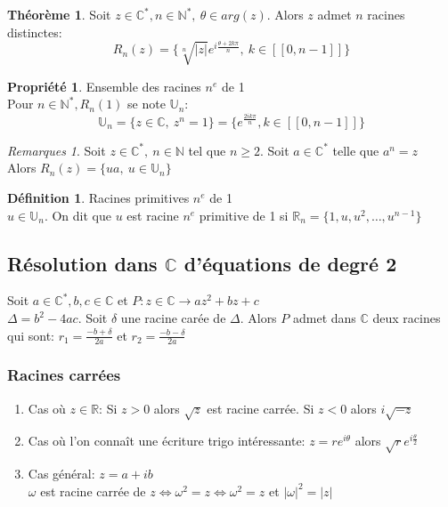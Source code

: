 \documentclass[fleqn]{article}
\theoremstyle{definition} \newtheorem*{defi}{D\'efinition}
\theoremstyle{definition} \newtheorem*{theo}{Th\'eor\`eme}
\theoremstyle{definition} \newtheorem*{coro}{Corollaire}
\theoremstyle{remark} \newtheorem*{rqs}{Remarques}
\theoremstyle{definition} \newtheorem*{prop}{Propri\'et\'e}
\begin{document}
\begin{theo} Soit $z \in \mathbb{C}^*, n \in \mathbb{N}^*,\ \theta \in arg(z)$. Alors $z$ admet $n$ racines distinctes:
	\[R_n(z) = \{\sqrt[n]{|z|}e^{i \frac{\theta + 2k\pi}{n}},\ k \in [\![0,n-1]\!] \}\]
\end{theo}

\begin{prop} Ensemble des racines $n^e$ de 1 \\
	Pour $n \in \mathbb{N}^*, R_n(1)$ se note $\mathbb{U}_n$:
	\[\mathbb{U}_n = \{z \in \mathbb{C},\ z^n = 1\} = \{e^{\frac{2ik\pi}{n}}, k \in [\![0,n-1]\!] \}\]
\end{prop}

\begin{rqs}
	Soit $z \in \mathbb{C}^*,\ n \in \mathbb{N}$ tel que $n \geq 2$. Soit $a \in \mathbb{C}^*$ telle que $a^n = z$ \\
	Alors $R_n(z) = \{ua,\ u \in \mathbb{U}_n\}$
\end{rqs}

\begin{defi} Racines primitives $n^e$ de 1 \\
	$u \in \mathbb{U}_n$. On dit que $u$ est racine $n^e$ primitive de 1 si $\mathbb{R}_n = \{1, u, u^2, \hdots, u^{n-1}\}$
\end{defi}

\subsection{R\'esolution dans $\mathbb{C}$ d'\'equations de degr\'e 2}
Soit $a \in \mathbb{C}^*,b,c \in \mathbb{C}$ et $P: z \in \mathbb{C} \rightarrow az^2 + bz + c$ \\
$\Delta = b^2 -4ac$. Soit $\delta$ une racine car\'ee de $\Delta$. Alors $P$ admet dans $\mathbb{C}$ deux racines qui sont: $r_1 =
\frac{-b+\delta}{2a}$ et $r_2 = \frac{-b-\delta}{2a}$

\subsubsection{Racines carr\'ees}
\begin{enumerate}
	\item Cas o\`u $z \in \mathbb{R}$: Si $z > 0$ alors $\sqrt{z}$ est racine carr\'ee. Si $z < 0$ alors $i\sqrt{-z}$
	\item Cas o\`u l'on conna\^it une \'ecriture trigo int\'eressante: $z = re^{i\theta}$ alors $\sqrt{r}e^{i\frac{\theta}{2}}$
	\item Cas g\'en\'eral: $z = a + ib$ \\
		$\omega$ est racine carr\'ee de $z \Leftrightarrow \omega^2 = z \Leftrightarrow \omega^2 = z$ et $|\omega|^2 = |z|$
\end{enumerate}
\end{document}
